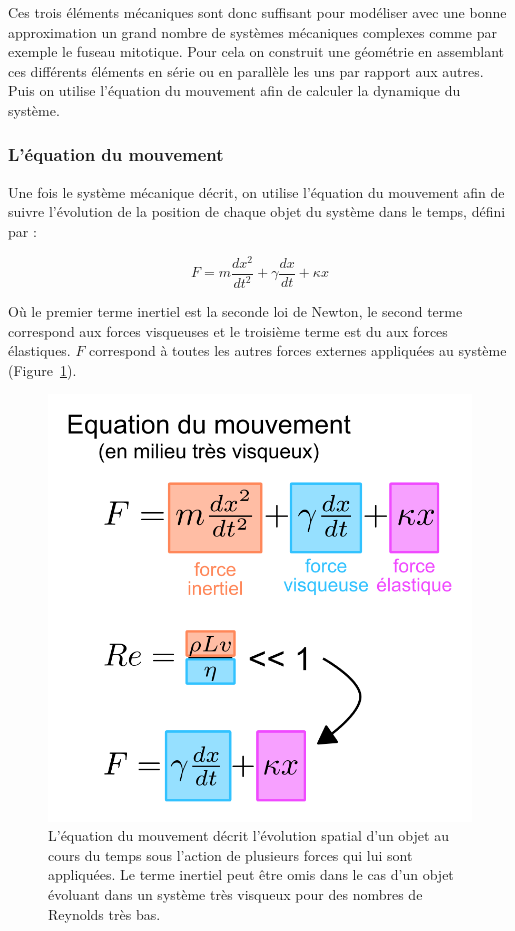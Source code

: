 \documentclass[12pt,a4paper,twoside,openright]{book}
\begin{document}
Ces trois éléments mécaniques sont donc suffisant pour modéliser avec
une bonne approximation un grand nombre de systèmes mécaniques complexes
comme par exemple le fuseau mitotique. Pour cela on construit une
géométrie en assemblant ces différents éléments en série ou en parallèle
les uns par rapport aux autres. Puis on utilise l'équation du mouvement
afin de calculer la dynamique du système.

\subsubsection{L'équation du mouvement}\label{luxe9quation-du-mouvement}

Une fois le système mécanique décrit, on utilise l'équation du mouvement
afin de suivre l'évolution de la position de chaque objet du système
dans le temps, défini par :

\[
F = m\frac{dx^2}{dt^2} + \gamma\frac{dx}{dt} + \kappa x
\]

Où le premier terme inertiel est la seconde loi de Newton, le second
terme correspond aux forces visqueuses et le troisième terme est du aux
forces élastiques. \(F\) correspond à toutes les autres forces externes
appliquées au système (Figure~\ref{fig:motion_equation}).

\begin{figure}[htbp]
\centering
\includegraphics{figures/intro/motion_equation.png}
\caption[L'équation du mouvement]{\label{fig:motion_equation}L'équation
du mouvement décrit l'évolution spatial d'un objet au cours du temps
sous l'action de plusieurs forces qui lui sont appliquées. Le terme
inertiel peut être omis dans le cas d'un objet évoluant dans un système
très visqueux pour des nombres de Reynolds très bas.}
\end{figure}
\end{document}
